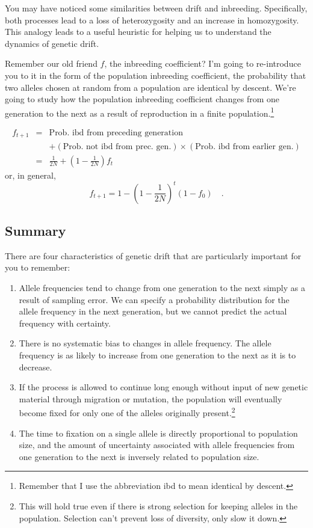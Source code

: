 \documentclass[12pt]{article}
\begin{document}
You may have noticed some similarities between drift and
inbreeding. Specifically, both processes lead to a loss of
heterozygosity and an increase in homozygosity. This analogy leads to
a useful heuristic for helping us to understand the dynamics of
genetic drift.

Remember our old friend $f$, the inbreeding coefficient? I'm going to
re-introduce you to it in the form of the population inbreeding
coefficient, the probability that two alleles chosen at random from a
population are identical by descent. We're going to study how the
population inbreeding coefficient changes from one generation to the
next as a result of reproduction in a finite
population.\footnote{Remember that I use the abbreviation ibd to mean
identical by descent.}

\begin{eqnarray*}
f_{t+1} &=& \mbox{Prob. ibd from preceding generation} \\
        &&  + (\mbox{Prob. not ibd from prec. gen.}) \times (\mbox{Prob. ibd from
          earlier gen.}) \\
   &=& \frac{1}{2N} + \left(1 - \frac{1}{2N}\right)f_t
\end{eqnarray*}
or, in general,
\[
f_{t+1} = 1 - \left(1 - \frac{1}{2N}\right)^t(1-f_0) \quad .
\]

\subsection*{Summary}

There are four characteristics of genetic drift that are particularly
important for you to remember:

\begin{enumerate}

\item Allele frequencies tend to change from one generation to the
next simply as a result of sampling error. We can specify a
probability distribution for the allele frequency in the next
generation, but we cannot predict the actual frequency with certainty.

\item There is no systematic bias to changes in allele frequency. The
allele frequency is as likely to increase from one generation to the
next as it is to decrease.

\item If the process is allowed to continue long enough without input
of new genetic material through migration or mutation, the population
will eventually become fixed for only one of the alleles originally
present.\footnote{This will hold true even if there is strong
selection for keeping alleles in the population. Selection can't
prevent loss of diversity, only slow it down.}

\item The time to fixation on a single allele is directly proportional
to population size, and the amount of uncertainty associated with
allele frequencies from one generation to the next is inversely
related to population size.

\end{enumerate}
\end{document}
